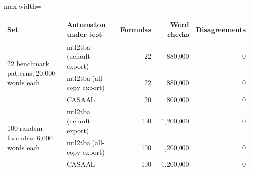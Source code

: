 \begin{adjustbox}{max width=\textwidth}\begin{tabular}{@{}llrrr@{}}
\toprule
Set & Automaton under test & Formulas & Word checks & Disagreements \\
\midrule
\multirow{3}{*}{22 benchmark patterns, 20{,}000 words each} & mtl2tba (default export) & 22 & 880{,}000 & 0 \\
 & mtl2tba (all-copy export) & 22 & 880{,}000 & 0 \\
 & CASAAL & 20 & 800{,}000 & 0 \\
\midrule
\multirow{3}{*}{100 random formulas, 6{,}000 words each} & mtl2tba (default export) & 100 & 1{,}200{,}000 & 0 \\
 & mtl2tba (all-copy export) & 100 & 1{,}200{,}000 & 0 \\
 & CASAAL & 100 & 1{,}200{,}000 & 0 \\
\bottomrule
\end{tabular}\end{adjustbox}
